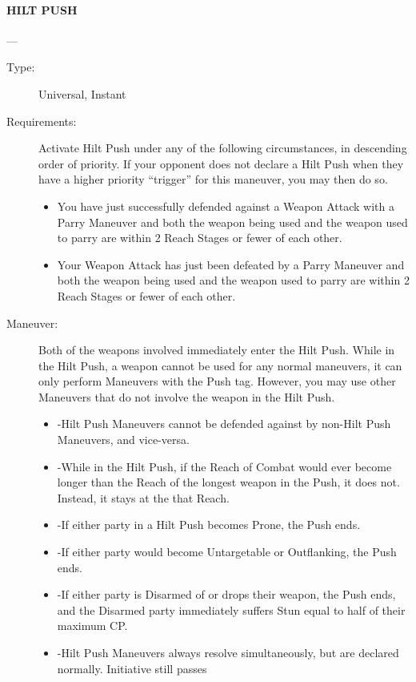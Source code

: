 \documentclass[oneside,11pt,english]{book}
\begin{document}
\paragraph{\large\label{man:HILT PUSH} HILT PUSH}---\quad{\large[2]}
\vspace{-10pt}\begin{description}
\item [Type:] Universal, Instant 
\item [Requirements:] Activate Hilt Push under any of the following circumstances, in descending order of 
priority. If your opponent does not declare a Hilt Push when they have a higher priority “trigger” for this 
maneuver, you may then do so.
	\begin{itemize}
		\item You have just successfully defended against a Weapon Attack with a Parry Maneuver and both the 
weapon being used and the weapon used to parry are within 2 Reach Stages or fewer of each other. 
		\item Your Weapon Attack has just been defeated by a Parry Maneuver and both the weapon being used and 
the weapon used to parry are within 2 Reach Stages or fewer of each other.
	\end{itemize}
\item [Maneuver:] Both of the weapons involved immediately enter the Hilt Push. 
While in the Hilt Push, a weapon cannot be used for any normal maneuvers, it can only perform 
Maneuvers with the Push tag. However, you may use other Maneuvers that do not involve the weapon in 
the Hilt Push.
	\begin{itemize}
		\item 
-Hilt Push Maneuvers cannot be defended against by non-Hilt Push Maneuvers, and vice-versa. 
		\item -While in the Hilt Push, if the Reach of Combat would ever become longer than the Reach of the longest 
weapon in the Push, it does not. Instead, it stays at the that Reach. 
		\item -If either party in a Hilt Push becomes Prone, the Push ends. 
		\item -If either party would become Untargetable or Outflanking, the Push ends. 
		\item -If either party is Disarmed of or drops their weapon, the Push ends, and the Disarmed party immediately 
suffers Stun equal to half of their maximum CP. 
		\item -Hilt Push Maneuvers always resolve simultaneously, but are declared normally. Initiative still passes 

\end{itemize}
\end{description}
\end{document}
